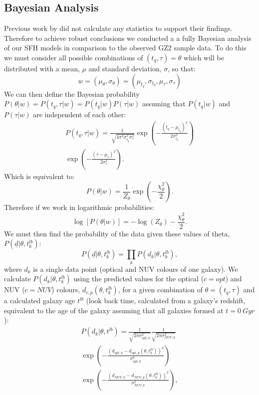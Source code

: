 \documentclass{mn2e}
\begin{document}
\subsection{Bayesian Analysis}
Previous work by \citet{Sch2014} did not calculate any statistics to support their findings. Therefore to achieve robust conclusions we conducted a a fully Bayesian analysis of our SFH models in comparison to the observed GZ2 sample data. To do this we must consider all possible combinations of $(t_{q}, \tau) = \theta$ which will be distributed with a mean, $\mu$ and standard deviation, $\sigma$, so that:
\begin{equation*}
w = (\mu_{\theta}, \sigma_{\theta}) = (\mu_{t_{q}}, \sigma_{t_{q}}, \mu_{\tau}, \sigma_{\tau})
\end{equation*}
We can then define the Bayesian probability $P(\theta|w) = P(t_{q}, \tau|w) = P(t_{q}|w)P(\tau|w)$ assuming that $ P(t_{q}|w)$ and $P(\tau|w)$ are independent of each other:
\begin{multline*}
P(t_{q}, \tau|w) = \frac{1}{\sqrt[]{4\pi^2\sigma^2_{t_{q}}\sigma^2_{\tau}}} \exp\left(-\frac{(t_{q}-\mu_{t_{q}})^2}{2\sigma^2_{t_{q}}}\right) \\ \exp\left(-\frac{(\tau-\mu_{\tau})^2}{2\sigma^2_{\tau}}\right).
\end{multline*}
Which is equivalent to:
\begin{equation*}
P(\theta|w) = \frac{1}{Z_{\theta}} \exp\left(-\frac{\chi_{\theta}^2}{2}\right).
\end{equation*}
Therefore if we work in logarithmic probabilities:
\begin{equation*}
\log[P(\theta|w)] = - \log(Z_{\theta}) - \frac{\chi_{\theta}^2}{2}.
\end{equation*}
We must then find the probability of the data given these values of theta, $P(\underline{d}|\theta, t_{k}^{lb})$:
\begin{equation*}
P(\underline{d}|\theta, t_{k}^{lb}) = \prod_{k} P(d_{k}|\theta, t_{k}^{lb}),
\end{equation*}
where $d_{k}$ is a single data point (optical and NUV colours of one galaxy). We calculate $P(d_{k}|\theta, t_{k}^{lb})$ using the predicted values for the optical ($c=opt$) and NUV ($c=NUV$) colours, $d_{c,p}(\theta, t_{k}^{lb})$, for a given combination of $\theta = (t_{q}, \tau)$ and a calculated galaxy age $t^{lb}$ (look back time, calculated from a galaxy's redshift, equivalent to the age of the galaxy assuming that all galaxies formed at $t=0~Gyr$):
\begin{multline*}
P(d_{k}|\theta, t^{lb}) = \frac{1}{\sqrt{2\pi\sigma_{opt, k}^2}}\frac{1}{\sqrt{2\pi\sigma_{NUV, k}^2}} \\ \exp{\left( - \frac{(d_{opt, k} - d_{opt, p}(\theta, t_{k}^{lb}))^2}{\sigma_{opt, k}^2} \right)} \\ \exp{\left( - \frac{(d_{NUV, k} - d_{NUV, p}(\theta, t_{k}^{lb}))^2}{\sigma_{NUV, k}^2} \right)},
\end{multline*}
\end{document}
